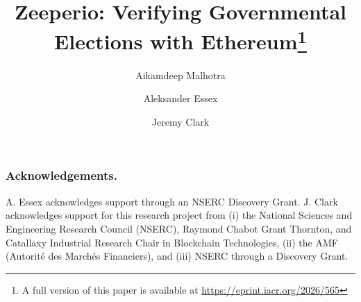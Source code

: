 \documentclass[runningheads]{llncs}
\begin{document}
\title{Zeeperio: Verifying Governmental Elections with Ethereum\thanks{A full version of this paper is available at \url{https://eprint.iacr.org/2026/565}}}


\author{
	Aikamdeep Malhotra \and
	Aleksander Essex \and
	Jeremy Clark
	}


\maketitle








\subsubsection*{Acknowledgements.}  A. Essex acknowledges support through an NSERC Discovery Grant. J. Clark acknowledges support for this research project from (i) the National Sciences and Engineering Research Council (NSERC), Raymond Chabot Grant Thornton, and Catallaxy Industrial Research Chair in Blockchain Technologies, (ii) the AMF (Autorité des Marchés Financiers), and (iii) NSERC through a Discovery Grant.
\end{document}
